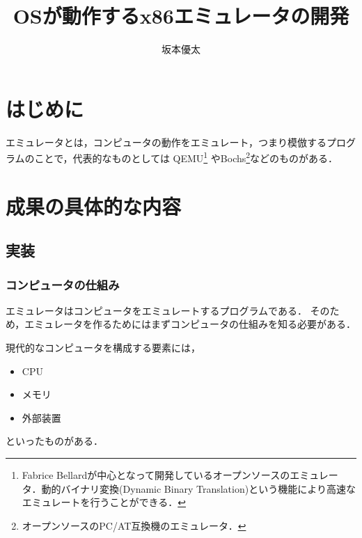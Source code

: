 \documentclass[10pt,a4j]{jsarticle}
\title{\vspace{-4cm}OSが動作するx86エミュレータの開発}
\author{坂本優太}
\date{}
\begin{document}
\maketitle


\section{はじめに}
エミュレータとは，コンピュータの動作をエミュレート，つまり模倣するプログラムのことで，代表的なものとしては
QEMU\footnote{Fabrice Bellardが中心となって開発しているオープンソースのエミュレータ．動的バイナリ変換(Dynamic Binary Translation)という機能により高速なエミュレートを行うことができる．}
やBochs\footnote{オープンソースのPC/AT互換機のエミュレータ．}などのものがある．


\section{成果の具体的な内容}

\subsection{実装}
\subsubsection{コンピュータの仕組み}
エミュレータはコンピュータをエミュレートするプログラムである．
そのため，エミュレータを作るためにはまずコンピュータの仕組みを知る必要がある．

現代的なコンピュータを構成する要素には，
\begin{itemize}
	\item CPU
	\item メモリ
	\item 外部装置
\end{itemize}
といったものがある．
\end{document}
